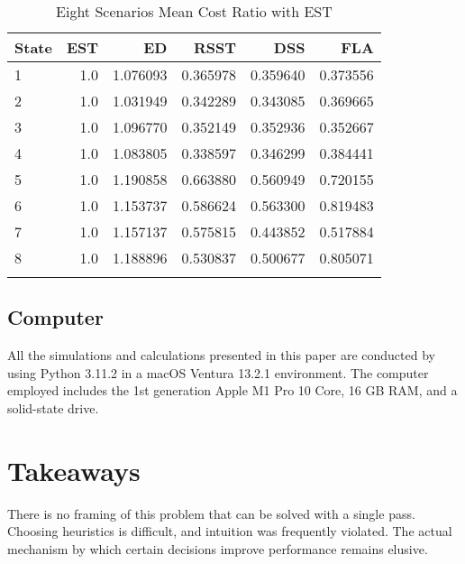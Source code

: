 \documentclass[conference]{IEEEtran}
\begin{document}
\begin{table}[h]
	\centering
	\begin{tabular}{lrrrrr}
		\hline
		\textbf{State} & \textbf{EST} & \textbf{ED} & \textbf{RSST} & \textbf{DSS} & \textbf{FLA} \\\hline
		1              & 1.0          & 1.076093    & 0.365978      & 0.359640     & 0.373556     \\
		2              & 1.0          & 1.031949    & 0.342289      & 0.343085     & 0.369665     \\
		3              & 1.0          & 1.096770    & 0.352149      & 0.352936     & 0.352667     \\
		4              & 1.0          & 1.083805    & 0.338597      & 0.346299     & 0.384441     \\
		5              & 1.0          & 1.190858    & 0.663880      & 0.560949     & 0.720155     \\
		6              & 1.0          & 1.153737    & 0.586624      & 0.563300     & 0.819483     \\
		7              & 1.0          & 1.157137    & 0.575815      & 0.443852     & 0.517884     \\
		8              & 1.0          & 1.188896    & 0.530837      & 0.500677     & 0.805071     \\ \hline
		\\
	\end{tabular}
	\caption{Eight Scenarios Mean Cost Ratio with EST}
	\label{tab:eight}
\end{table}

\subsection{Computer}

All the simulations and calculations presented in this paper are conducted by using Python 3.11.2 in a macOS Ventura 13.2.1 environment.
The computer employed includes the 1st generation Apple M1 Pro 10 Core, 16 GB RAM, and a solid-state drive.

\section{Takeaways}

There is no framing of this problem that can be solved with a single pass.
Choosing heuristics is difficult, and intuition was frequently violated.
The actual mechanism by which certain decisions improve performance remains elusive.
\end{document}
